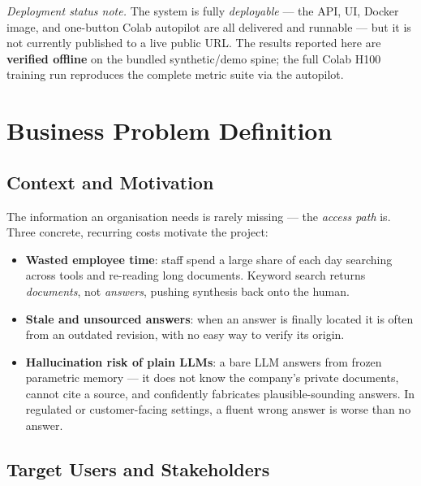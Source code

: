 \documentclass[12pt,a4paper]{article}
\begin{document}
\noindent\textit{Deployment status note.} The system is fully \emph{deployable} --- the API, UI, Docker image, and one-button Colab autopilot are all delivered and runnable --- but it is not currently published to a live public URL. The results reported here are \textbf{verified offline} on the bundled synthetic/demo spine; the full Colab H100 training run reproduces the complete metric suite via the autopilot.

\section{Business Problem Definition}

\subsection{Context and Motivation}

The information an organisation needs is rarely missing --- the \emph{access path} is. Three concrete, recurring costs motivate the project:
\begin{itemize}
  \item \textbf{Wasted employee time}: staff spend a large share of each day searching across tools and re-reading long documents. Keyword search returns \emph{documents}, not \emph{answers}, pushing synthesis back onto the human.
  \item \textbf{Stale and unsourced answers}: when an answer is finally located it is often from an outdated revision, with no easy way to verify its origin.
  \item \textbf{Hallucination risk of plain LLMs}: a bare LLM answers from frozen parametric memory --- it does not know the company's private documents, cannot cite a source, and confidently fabricates plausible-sounding answers. In regulated or customer-facing settings, a fluent wrong answer is worse than no answer.
\end{itemize}

\subsection{Target Users and Stakeholders}
\end{document}
